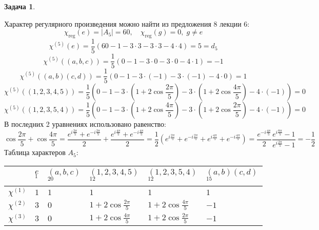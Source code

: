 \documentclass[12pt]{article}
\theoremstyle{definition}
\newtheorem{zad}{Задача}[section]
\begin{document}
\begin{zad}
\begin{itemize}
\begin{equation}
    \end{equation}
    Характер регулярного произведения можно найти из предложения 8 лекции 6:
    \begin{equation}
        \chi_\text{reg}(e)=|A_5|=60, \quad \chi_\text{reg}(g)=0, \; g\neq e
    \end{equation}
    \begin{equation}
        \chi^{(5)}(e)=\frac{1}{5}(60-1-3\cdot 3-3\cdot 3-4\cdot4)=5=d_5
    \end{equation}
    \begin{equation}
        \chi^{(5)}((a,b,c))=\frac{1}{5}(0-1-3\cdot 0-3\cdot0-4\cdot1)=-1
    \end{equation}
    \begin{equation}
        \chi^{(5)}((a,b)(c,d))=\frac{1}{5}(0-1-3\cdot (-1)-3\cdot (-1)-4\cdot0)=1
    \end{equation}
    \begin{equation}
        \chi^{(5)}((1,2,3,4,5))=\frac{1}{5}(0-1-3\cdot (1+2\cos\frac{2\pi}{5})-3\cdot (1+2\cos\frac{4\pi}{5})-4\cdot(-1))=0
    \end{equation}
    \begin{equation}
        \chi^{(5)}((1,2,3,5,4))=\frac{1}{5}(0-1-3\cdot (1+2\cos\frac{4\pi}{5})-3\cdot (1+2\cos\frac{2\pi}{5})-4\cdot(-1))=0
    \end{equation}
    В последних 2 уравнениях использовано равенство:
    \begin{equation}
        \cos\frac{2\pi}{5}+\cos\frac{4\pi}{5}=\frac{e^{i\frac{2\pi}{5}}+e^{-i\frac{2\pi}{5}}}{2}+\frac{e^{i\frac{4\pi}{5}}+e^{-i\frac{4\pi}{5}}}{2}=\frac{1}{2}(e^{i\frac{2\pi}{5}}+e^{-i\frac{2\pi}{5}}+e^{i\frac{4\pi}{5}}+e^{-i\frac{4\pi}{5}})=\frac{e^{-i\frac{4\pi}{5}}}{2}\frac{e^{i\frac{8\pi}{5}}-1}{e^{i\frac{2\pi}{5}}-1}=-\frac{1}{2}
    \end{equation}
    Таблица характеров $A_5$:
    \begin{table}[h!]
    \centering
    \begin{tabular}{|l|l|l|l|l|l|}
    \hline
     & $e$ $^1$ & $(a,b,c)$ $^{20}$ & $(1,2,3,4,5)$ $^{12}$ & $(1,2,3,5,4)$ $^{12}$ & $(a,b)(c,d)$ $^{15}$    \\ \hline
    $\chi^{(1)}$ & $1$ & $1$ & $1$ & $1$ & $1$ \\ \hline
    $\chi^{(2)}$ & $3$ & $0$ & $1+2\cos\frac{2\pi}{5}$ & $1+2\cos\frac{4\pi}{5}$ & $-1$ \\ \hline
    $\chi^{(3)}$ & $3$ & $0$ & $1+2\cos\frac{4\pi}{5}$ & $1+2\cos\frac{2\pi}{5}$ & $-1$ \\ \hline

\end{tabular}
\end{table}
\end{itemize}
\end{zad}
\end{document}
